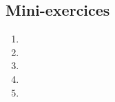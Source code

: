 \subsection{}

\subsection{}

\subsection{Mini-exercices}

\begin{enumerate}
  \item 
  \item 
  \item 
  \item 
  \item 
\end{enumerate}



\section{}

\subsection{}

\subsection{}

\subsection{}

\subsection{}

